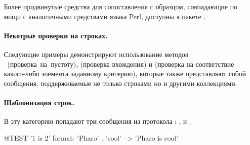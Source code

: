 \documentclass[a4paper,10pt,twoside]{book}
\begin{document}
Более продвинутые средства для сопоставления с образцом, совпадающие по мощи с аналогичными средствами языка Perl, доступны в пакете .

\paragraph{Некотрые проверки на строках.} Следующие примеры демонстрируют использование методов \mbox{ (проверка на пустоту),}  (проверка вхождения) и  (проверка на соответствие какого-либо элемента заданному критерию), которые также представляют собой сообщения, поддерживаемые не только строками но и другими коллекциями.


\paragraph{Шаблонизация строк.}
В эту категорию попадают три сообщения из протокола : ,  и .

\begin{code}{@TEST}
'{1} is {2}' format: {'Pharo' . 'cool'}  --> 'Pharo is cool'
\end{code}
\end{document}
